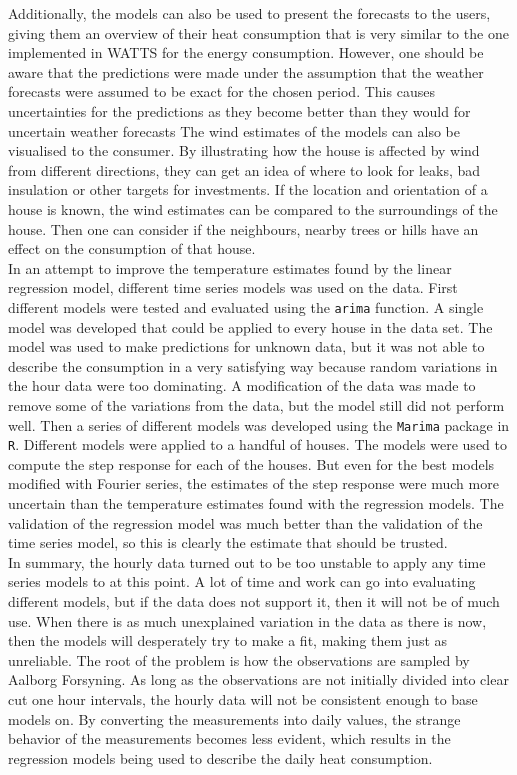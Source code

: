\noindent Additionally, the models can also be used to present the forecasts to the users, giving them an overview of their heat consumption that is very similar to the one implemented in WATTS for the energy consumption. However, one should be aware that the predictions were made under the assumption that the weather forecasts were assumed to be exact for the chosen period. This causes uncertainties for the predictions as they become better than they would for uncertain weather forecasts The wind estimates of the models can also be visualised to the consumer. By illustrating how the house is affected by wind from different directions, they can get an idea of where to look for leaks, bad insulation or other targets for investments. If the location and orientation of a house is known, the wind estimates can be compared to the surroundings of the house. Then one can consider if the neighbours, nearby trees or hills have an effect on the consumption of that house. \\

\noindent In an attempt to improve the temperature estimates found by the linear regression model, different time series models was used on the data. First different models were tested and evaluated using the \texttt{arima} function. A single model was developed that could be applied to every house in the data set. The model was used to make predictions for unknown data, but it was not able to describe the consumption in a very satisfying way because random variations in the hour data were too dominating. A modification of the data was made to remove some of the variations from the data, but the model still did not perform well. Then a series of different models was developed using the \texttt{Marima} package in \texttt{R}. Different models were applied to a handful of houses. The models were used to compute the step response for each of the houses. But even for the best models modified with Fourier series, the estimates of the step response were much more uncertain than the temperature estimates found with the regression models. The validation of the regression model was much better than the validation of the time series model, so this is clearly the estimate that should be trusted. \\

\noindent In summary, the hourly data turned out to be too unstable to apply any time series models to at this point. A lot of time and work can go into evaluating different models, but if the data does not support it, then it will not be of much use. When there is as much unexplained variation in the data as there is now, then the models will desperately try to make a fit, making them just as unreliable. The root of the problem is how the observations are sampled by Aalborg Forsyning. As long as the observations are not initially divided into clear cut one hour intervals, the hourly data will not be consistent enough to base models on. By converting the measurements into daily values, the strange behavior of the measurements becomes less evident, which results in the regression models being used to describe the daily heat consumption. \\

